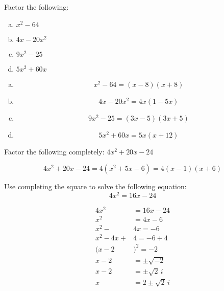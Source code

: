 \documentclass[11pt,letterpaper]{article}
\begin{document}
\newpage



 Factor the following:
	\begin{enumerate}[(a)]
	\item $x^2 - 64$
	\item $4x - 20x^2$
	\item $9x^2 - 25$
	\item $5x^2 + 60x$
	\end{enumerate} \pspace

\sol
\begin{enumerate}[(a)]
\item 
	\[
	x^2 - 64= (x - 8)(x + 8)
	\] \pspace

\item 
	\[
	4x - 20x^2= 4x(1 - 5x)
	\] \pspace

\item 
	\[
	9x^2 - 25= (3x - 5)(3x + 5)
	\] \pspace

\item 
	\[
	5x^2 + 60x= 5x(x + 12)
	\]
\end{enumerate}



\newpage



 Factor the following completely: $4x^2 + 20x - 24$ \pspace

	\[
	4x^2 + 20x - 24= 4(x^2 + 5x - 6)= 4(x -1)(x + 6)
	\]



\newpage



 Use completing the square to solve the following equation:
	\[
	4x^2= 16x - 24
	\] \pspace

\sol
	\[
	\begin{aligned}
	4x^2&= 16x - 24 \\[0.3cm]
	x^2&= 4x - 6 \\[0.3cm]
	x^2 - &4x= -6 \\[0.3cm]
	x^2 - 4x + &4= -6 + 4 \\[0.3cm]
	(x - 2&)^2= -2 \\[0.3cm]
	x - 2&= \pm \sqrt{-2} \\[0.3cm]
	x - 2&= \pm \sqrt{2} \,i \\[0.3cm]
	x&= 2 \pm \sqrt{2}\, i
	\end{aligned}
	\]



\newpage
\end{document}
